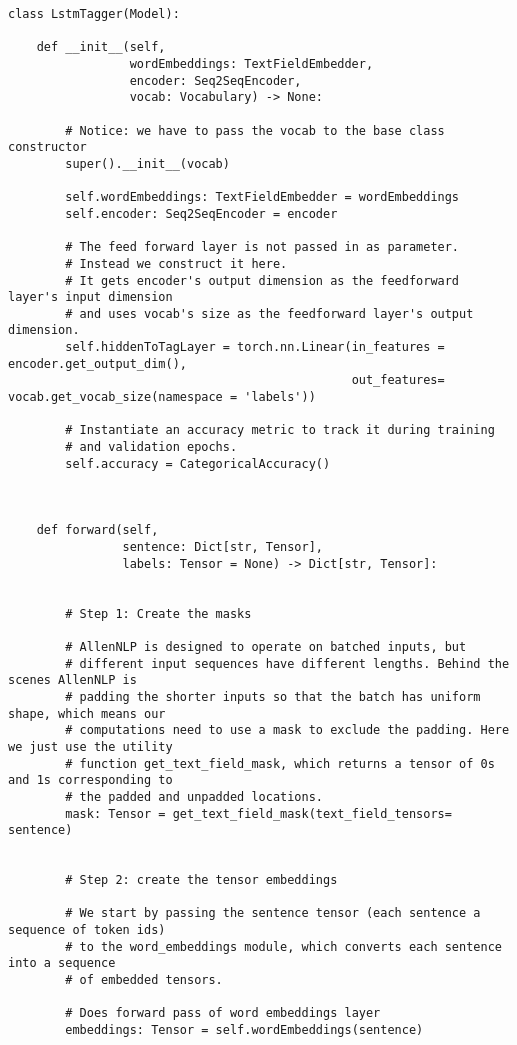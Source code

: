 \documentclass[
]{article}
\begin{document}
\begin{verbatim}
class LstmTagger(Model):

    def __init__(self,
                 wordEmbeddings: TextFieldEmbedder,
                 encoder: Seq2SeqEncoder,
                 vocab: Vocabulary) -> None:

        # Notice: we have to pass the vocab to the base class constructor
        super().__init__(vocab)

        self.wordEmbeddings: TextFieldEmbedder = wordEmbeddings
        self.encoder: Seq2SeqEncoder = encoder

        # The feed forward layer is not passed in as parameter.
        # Instead we construct it here.
        # It gets encoder's output dimension as the feedforward layer's input dimension
        # and uses vocab's size as the feedforward layer's output dimension.
        self.hiddenToTagLayer = torch.nn.Linear(in_features = encoder.get_output_dim(),
                                                out_features= vocab.get_vocab_size(namespace = 'labels'))

        # Instantiate an accuracy metric to track it during training
        # and validation epochs.
        self.accuracy = CategoricalAccuracy()



    def forward(self,
                sentence: Dict[str, Tensor],
                labels: Tensor = None) -> Dict[str, Tensor]:


        # Step 1: Create the masks

        # AllenNLP is designed to operate on batched inputs, but
        # different input sequences have different lengths. Behind the scenes AllenNLP is
        # padding the shorter inputs so that the batch has uniform shape, which means our
        # computations need to use a mask to exclude the padding. Here we just use the utility
        # function get_text_field_mask, which returns a tensor of 0s and 1s corresponding to
        # the padded and unpadded locations.
        mask: Tensor = get_text_field_mask(text_field_tensors= sentence)


        # Step 2: create the tensor embeddings

        # We start by passing the sentence tensor (each sentence a sequence of token ids)
        # to the word_embeddings module, which converts each sentence into a sequence
        # of embedded tensors.

        # Does forward pass of word embeddings layer
        embeddings: Tensor = self.wordEmbeddings(sentence)



\end{verbatim}
\end{document}

